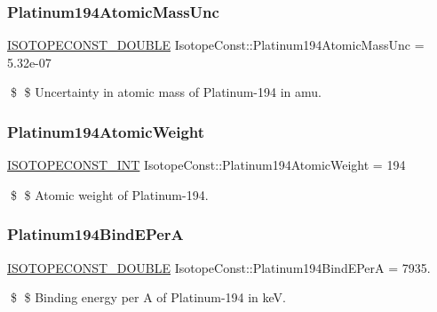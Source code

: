 \subsubsection{\texorpdfstring{Platinum194\+Atomic\+Mass\+Unc}{Platinum194AtomicMassUnc}}
{\footnotesize\ttfamily \mbox{\hyperlink{group___isotope_const-_macros_ga8f45a7272ce02c0b4c65c44636ed719a}{I\+S\+O\+T\+O\+P\+E\+C\+O\+N\+S\+T\+\_\+\+D\+O\+U\+B\+LE}} Isotope\+Const\+::\+Platinum194\+Atomic\+Mass\+Unc = 5.\+32e-\/07}

\$ \$ Uncertainty in atomic mass of Platinum-\/194 in amu. \mbox{\label{group___isotope_const-_platinum-_pt194_gacf196fe2ddf735c3cc9e68979e78d031}} 
\subsubsection{\texorpdfstring{Platinum194\+Atomic\+Weight}{Platinum194AtomicWeight}}
{\footnotesize\ttfamily \mbox{\hyperlink{group___isotope_const-_macros_ga5f18360b3e99483a35c32d789e62621c}{I\+S\+O\+T\+O\+P\+E\+C\+O\+N\+S\+T\+\_\+\+I\+NT}} Isotope\+Const\+::\+Platinum194\+Atomic\+Weight = 194}

\$ \$ Atomic weight of Platinum-\/194. \mbox{\label{group___isotope_const-_platinum-_pt194_gacbe8e4b2d549c3dd7e26d9529ef55795}} 
\subsubsection{\texorpdfstring{Platinum194\+Bind\+E\+PerA}{Platinum194BindEPerA}}
{\footnotesize\ttfamily \mbox{\hyperlink{group___isotope_const-_macros_ga8f45a7272ce02c0b4c65c44636ed719a}{I\+S\+O\+T\+O\+P\+E\+C\+O\+N\+S\+T\+\_\+\+D\+O\+U\+B\+LE}} Isotope\+Const\+::\+Platinum194\+Bind\+E\+PerA = 7935.}

\$ \$ Binding energy per A of Platinum-\/194 in keV. \mbox{\label{group___isotope_const-_platinum-_pt194_ga44b1c1360943e342628b85fbf7fd720c}} 

